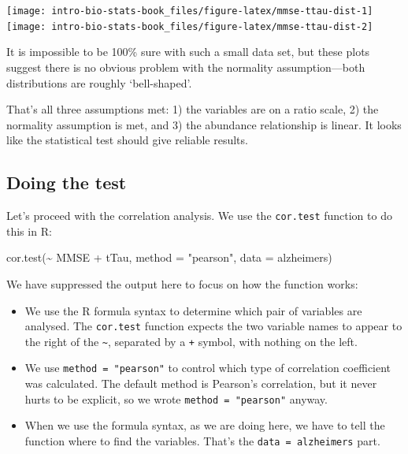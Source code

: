 \documentclass[
]{book}
\newenvironment{Shaded}{\begin{snugshade}}{\end{snugshade}}
\newcommand{\AttributeTok}[1]{\textcolor[rgb]{0.77,0.63,0.00}{#1}}
\newcommand{\FunctionTok}[1]{\textcolor[rgb]{0.00,0.00,0.00}{#1}}
\newcommand{\NormalTok}[1]{#1}
\newcommand{\SpecialCharTok}[1]{\textcolor[rgb]{0.00,0.00,0.00}{#1}}
\newcommand{\StringTok}[1]{\textcolor[rgb]{0.31,0.60,0.02}{#1}}
\providecommand{\tightlist}{%
  \setlength{\itemsep}{0pt}\setlength{\parskip}{0pt}}
\begin{document}
\texttt{[image: intro-bio-stats-book\_files/figure-latex/mmse-ttau-dist-1]} \texttt{[image: intro-bio-stats-book\_files/figure-latex/mmse-ttau-dist-2]}

It is impossible to be 100\% sure with such a small data set, but these plots suggest there is no obvious problem with the normality assumption---both distributions are roughly `bell-shaped'.

That's all three assumptions met: 1) the variables are on a ratio scale, 2) the normality assumption is met, and 3) the abundance relationship is linear. It looks like the statistical test should give reliable results.

\hypertarget{doing-the-test}{%
\subsection{Doing the test}\label{doing-the-test}}

Let's proceed with the correlation analysis. We use the \texttt{cor.test} function to do this in R:

\begin{Shaded}
\begin{Highlighting}[]
\FunctionTok{cor.test}\NormalTok{(}\SpecialCharTok{\textasciitilde{}}\NormalTok{ MMSE }\SpecialCharTok{+}\NormalTok{ tTau, }\AttributeTok{method =} \StringTok{"pearson"}\NormalTok{, }\AttributeTok{data =}\NormalTok{ alzheimers)}
\end{Highlighting}
\end{Shaded}

We have suppressed the output here to focus on how the function works:

\begin{itemize}
\tightlist
\item
  We use the R formula syntax to determine which pair of variables are analysed. The \texttt{cor.test} function expects the two variable names to appear to the right of the \texttt{\textasciitilde{}}, separated by a \texttt{+} symbol, with nothing on the left.
\item
  We use \texttt{method\ =\ "pearson"} to control which type of correlation coefficient was calculated. The default method is Pearson's correlation, but it never hurts to be explicit, so we wrote \texttt{method\ =\ "pearson"} anyway.
\item
  When we use the formula syntax, as we are doing here, we have to tell the function where to find the variables. That's the \texttt{data\ =\ alzheimers} part.
\end{itemize}
\end{document}
